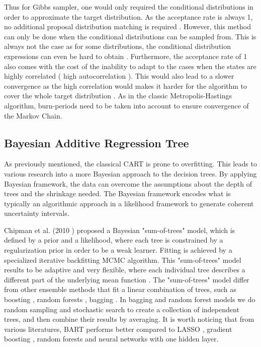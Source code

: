 \documentclass{usiinftr}
\begin{document}
Thus for Gibbs sampler, one would only required the conditional distributions in order to approximate the 
target distribution. As the acceptance rate is always 1, no additional proposal distribution matching is required \cite{21}. However, this method can only be done when the conditional distributions can be sampled from. This is always not the case as for some distributions, the conditional distribution expressions can even be hard to obtain \cite{21}. Furthermore, the acceptance rate of 1 also comes with the cost of the inability to adapt to the cases when the states are highly correlated ( high autocorrelation ). This would also lead to a slower convergence as the high correlation would makes it harder for the algorithm to cover the whole target distribution \cite{21}. As in the classic Metropolis-Hastings algorithm, burn-periods need to be taken into account to ensure convergence of the Markov Chain.

\subsection{Bayesian Additive Regression Tree}
As previously mentioned, the classical CART is prone to overfitting. This leads to various research into a more Bayesian approach to the decision trees. By applying Bayesian framework, the data can overcome the assumptions about the depth of trees and the shrinkage needed. The Bayesian framework encodes what is typically an algorithmic approach in a likelihood framework to generate coherent uncertainty intervals.

 Chipman et al. (2010 )\cite{7} proposed a Bayesian "sum-of-trees" model, which is defined by a prior and a likelihood, where each tree is constrained by a regularization prior in order to be a weak learner.  Fitting is achieved by a specialized iterative backfitting MCMC algorithm. This "sum-of-trees" model results to be adaptive and very flexible, where each individual tree describes a different part of the underlying mean function \cite{7}. The "sum-of-trees" model differ from other ensemble methods that fit a linear combination of trees, such as boosting \cite{11}, random forests \cite{10}, bagging \cite{12}. In bagging and random forest models we do random sampling and stochastic search to create a collection of independent trees, and then combine their results by averaging. It is worth noticing that from various literatures, BART performs better compared to LASSO \cite{8}, gradient boosting \cite{9}, random forests \cite{10} and neural networks with one hidden layer. 
 
\end{document}
